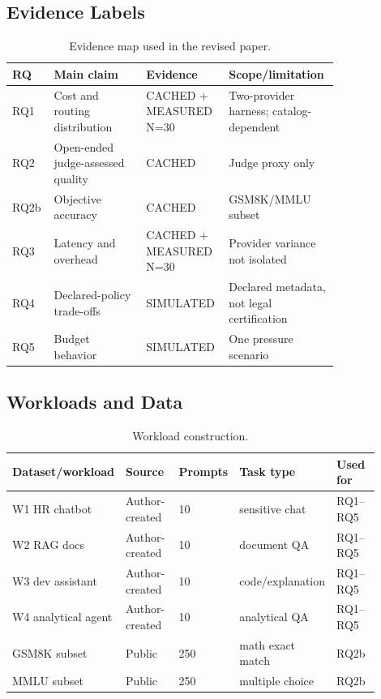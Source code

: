 \documentclass[10pt,journal,compsoc]{IEEEtran}
\begin{document}
\subsection{Evidence Labels}
\begin{table}[t]
\centering
\caption{Evidence map used in the revised paper.}
\label{tab:evidence}
\begin{tabular}{p{0.11\linewidth}p{0.27\linewidth}p{0.18\linewidth}p{0.24\linewidth}}
\toprule
RQ & Main claim & Evidence & Scope/limitation \\
\midrule
RQ1 & Cost and routing distribution & CACHED + MEASURED N=30 & Two-provider harness; catalog-dependent \\
RQ2 & Open-ended judge-assessed quality & CACHED & Judge proxy only \\
RQ2b & Objective accuracy & CACHED & GSM8K/MMLU subset \\
RQ3 & Latency and overhead & CACHED + MEASURED N=30 & Provider variance not isolated \\
RQ4 & Declared-policy trade-offs & SIMULATED & Declared metadata, not legal certification \\
RQ5 & Budget behavior & SIMULATED & One pressure scenario \\
\bottomrule
\end{tabular}
\end{table}

\subsection{Workloads and Data}
\begin{table}[t]
\centering
\caption{Workload construction.}
\label{tab:workloads}
\begin{tabular}{p{0.26\linewidth}p{0.18\linewidth}p{0.12\linewidth}p{0.18\linewidth}p{0.16\linewidth}}
\toprule
Dataset/workload & Source & Prompts & Task type & Used for \\
\midrule
W1 HR chatbot & Author-created & 10 & sensitive chat & RQ1--RQ5 \\
W2 RAG docs & Author-created & 10 & document QA & RQ1--RQ5 \\
W3 dev assistant & Author-created & 10 & code/explanation & RQ1--RQ5 \\
W4 analytical agent & Author-created & 10 & analytical QA & RQ1--RQ5 \\
GSM8K subset & Public~\cite{cobbe2021gsm8k} & 250 & math exact match & RQ2b \\
MMLU subset & Public~\cite{hendrycks2021mmlu} & 250 & multiple choice & RQ2b \\
\bottomrule
\end{tabular}
\end{table}
\end{document}
